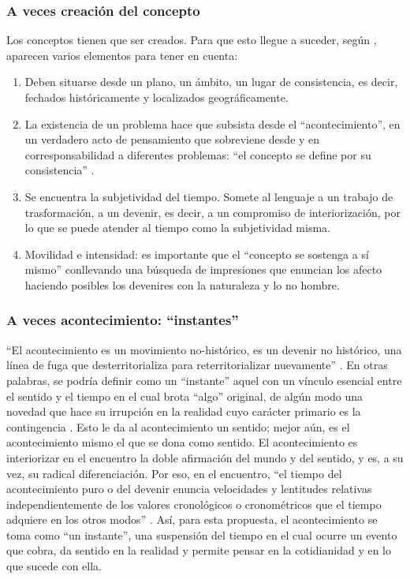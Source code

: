 \documentclass[spanish]{textolivre}
\begin{document}
\subsubsection{A veces creación del concepto}\label{sec-creacion}
Los conceptos tienen que ser creados. Para que esto llegue a suceder, según \textcite{deleuze_que_1993}, aparecen varios elementos para tener en cuenta: 

\begin{enumerate}
    \item Deben situarse desde un plano, un ámbito, un lugar de consistencia, es decir, fechados históricamente y localizados geográficamente. 
    \item La existencia de un problema hace que subsista desde el “acontecimiento”, en un verdadero acto de pensamiento que sobreviene desde y en corresponsabilidad a diferentes problemas: “el concepto se define por su consistencia” \cite[p. 27]{deleuze_que_1993}. 
    \item Se encuentra la subjetividad del tiempo. Somete al lenguaje a un trabajo de trasformación, a un devenir, es decir, a un compromiso de interiorización, por lo que se puede atender al tiempo como la subjetividad misma. 
    \item Movilidad e intensidad: es importante que el “concepto se sostenga a sí mismo” \cite[p. 65]{deleuze_que_1993} conllevando una búsqueda de impresiones que enuncian los afecto haciendo posibles los devenires con la naturaleza y lo no hombre.
\end{enumerate}

\subsubsection{A veces acontecimiento: “instantes”}\label{sec-acontecimento}
“El acontecimiento es un movimiento no-histórico, es un devenir no histórico, una línea de fuga que desterritorializa para reterritorializar nuevamente” \cite[p. 97]{deleuze_que_1993}. En otras palabras, se podría definir como un “instante” aquel con un vínculo esencial entre el sentido y el tiempo en el cual brota “algo” original, de algún modo una novedad que hace su irrupción en la realidad cuyo carácter primario es la contingencia \cite{esperon_acontecimiento_2014}. Esto le da al acontecimiento un sentido; mejor aún, es el acontecimiento mismo el que se dona como sentido. El acontecimiento es interiorizar en el encuentro la doble afirmación del mundo y del sentido, y es, a su vez, su radical diferenciación. Por eso, en el encuentro, “el tiempo del acontecimiento puro o del devenir enuncia velocidades y lentitudes relativas independientemente de los valores cronológicos o cronométricos que el tiempo adquiere en los otros modos” \cite[p. 267]{deleuze_mil_1980}. Así, para esta propuesta, el acontecimiento se toma como “un instante”, una suspensión del tiempo en el cual ocurre un evento que cobra, da sentido en la realidad y permite pensar en la cotidianidad y en lo que sucede con ella.
\end{document}
